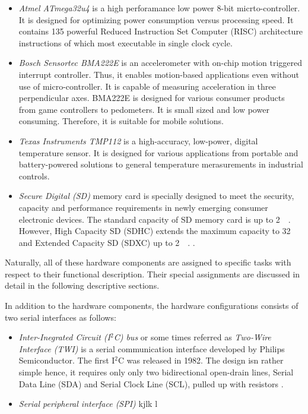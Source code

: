 \documentclass[english,12pt,a4paper,pdftex,elec,utf8]{aaltothesis}
\begin{document}
\begin{itemize}
\item \textit{Atmel ATmega32u4} is a high perforamance low power 8-bit micrto-controller. It is designed for optimizing power consumption versus processing speed. It contains 135 powerful Reduced Instruction Set Computer (RISC) architecture instructions of which most executable in single clock cycle.  \cite{atmega32u4datasheet} 


\item \textit{Bosch Sensortec BMA222E} is an accelerometer with on-chip motion triggered interrupt controller. Thus, it enables motion-based applications even without use of micro-controller. It is capable of measuring acceleration in three perpendicular axes. BMA222E is designed for various consumer products from game controllers to pedometers. It is small sized and low power consuming. Therefore, it is suitable for mobile solutions.  \cite{bma222datasheet} 

\item \textit{Texas Instruments TMP112} is a high-accuracy, low-power, digital temperature sensor. It is designed for various applications from portable and battery-powered solutions to general temperature merasurements in industrial controls. \cite{tmp112datasheet} 

\item \textit{Secure Digital (SD)} memory card is specially designed to meet the security, capacity and performance requirements in newly emerging consumer electronic devices. The standard capacity of SD memory card is up to \SI{2}{\giga\byte}. However, High Capacity SD (SDHC) extends the maximum capacity to \SI{32}{\giga\byte} and Extended Capacity SD (SDXC) up to \SI{2}{\tera\byte}. \cite{sdspecification}.

\end{itemize} Naturally, all of these hardware components are assigned to specific tasks with respect to their functional description. Their special assignments are discussed in detail in the following descriptive sections.

In addition to the hardware components, the hardware configurations consists of two serial interfaces as follows:

\begin{itemize}
\item \textit{Inter-Inegrated Circuit (I$^2$C) bus} or some times referred as \textit{Two-Wire Interface (TWI)} is a serial communication interface developed by Philips Semiconductor. The first I$^2$C was released in 1982. The design isn rather simple hence, it requires only only two bidirectional open-drain lines, Serial Data Line (SDA) and Serial Clock Line (SCL), pulled up with resistors \cite{i2cmanual}.


\item \textit{Serial peripheral interface (SPI)} \cite{spimanual} kjlk l
\end{itemize}
\end{document}
